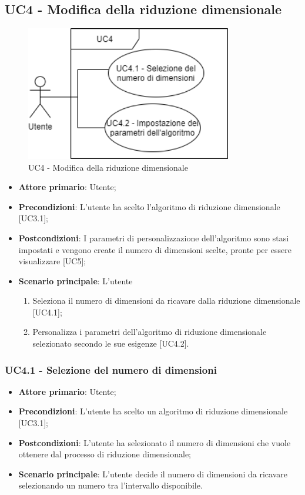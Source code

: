 \subsection{UC4 - Modifica della riduzione dimensionale}
\begin{figure}[h]
\includegraphics[width=9cm]{Section/Images/UC4.png}
\centering
\caption{UC4 - Modifica della riduzione dimensionale}
\end{figure}
\begin{itemize}
	\item \textbf{Attore primario}: Utente;
	\item \textbf{Precondizioni}: L'utente ha scelto l'algoritmo di riduzione dimensionale [UC3.1];
	\item \textbf{Postcondizioni}: I parametri di personalizzazione dell'algoritmo sono stasi impostati e vengono create il numero di dimensioni scelte, pronte per essere visualizzare [UC5];
	\item \textbf{Scenario principale}: L'utente
	
	\begin{enumerate}
		\item Seleziona il numero di dimensioni da ricavare dalla riduzione dimensionale [UC4.1];
		\item Personalizza i parametri dell'algoritmo di riduzione dimensionale selezionato secondo le sue esigenze [UC4.2].
	\end{enumerate}		
\end{itemize}

\subsubsection{UC4.1 - Selezione del numero di dimensioni}

\begin{itemize}
	\item \textbf{Attore primario}: Utente;
	
	\item \textbf{Precondizioni}: L'utente ha scelto un algoritmo di riduzione dimensionale [UC3.1];
	
	\item \textbf{Postcondizioni}: L'utente ha selezionato il numero di dimensioni che vuole ottenere dal processo di riduzione dimensionale;
	
	\item \textbf{Scenario principale}: L'utente decide il numero di dimensioni da ricavare selezionando un numero tra l'intervallo disponibile.
\end{itemize}	
	
